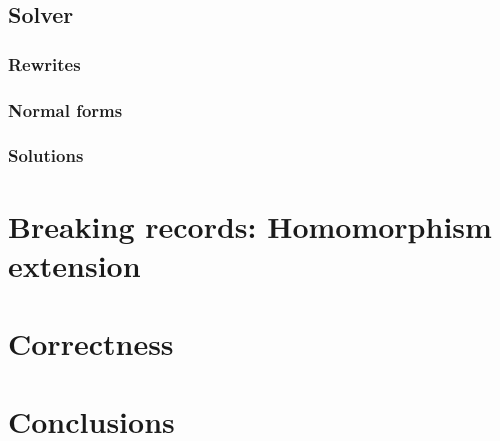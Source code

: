 \subsection{Solver}
\label{subsec:cstr-solver}

\subsubsection{Rewrites}

\subsubsection{Normal forms}

\subsubsection{Solutions}

\section{Breaking records: Homomorphism extension}

\section{Correctness}
\label{sec:correctness}

\section{Conclusions}
\label{sec:conclusions}


